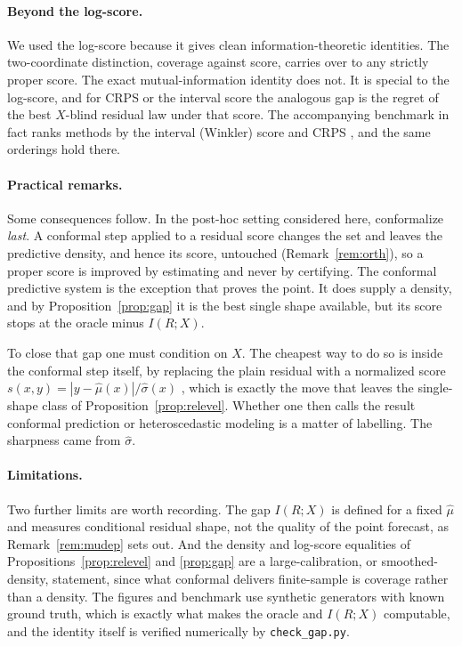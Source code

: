 \documentclass[11pt]{article}
\theoremstyle{definition}
\begin{document}
\paragraph{Beyond the log-score.}
We used the log-score because it gives clean information-theoretic identities. The
two-coordinate distinction, coverage against score, carries over to any strictly proper
score. The exact mutual-information identity does not. It is special to the log-score, and
for CRPS or the interval score the analogous gap is the regret of the best $X$-blind
residual law under that score. The accompanying benchmark in fact ranks methods by the
interval (Winkler) score and CRPS \citep{gneiting2007strictly}, and the same orderings hold
there.

\paragraph{Practical remarks.} Some consequences follow. In the post-hoc setting considered
here, conformalize \emph{last}. A conformal step applied to a residual score changes the set
and leaves the predictive density, and hence its score, untouched
(Remark~\ref{rem:orth}), so a proper score is improved by estimating and never by
certifying. The conformal predictive system is the exception that proves the point. It does
supply a density, and by Proposition~\ref{prop:gap} it is the best single shape available,
but its score stops at the oracle minus $I(R;X)$.

To close that gap one must condition on $X$. The cheapest way to do so is inside the
conformal step itself, by replacing the plain residual with a normalized score
$s(x,y)=|y-\hat\mu(x)|/\hat\sigma(x)$ \citep{lei2018distribution}, which is exactly the move
that leaves the single-shape class of Proposition~\ref{prop:relevel}. Whether one then calls
the result conformal prediction or heteroscedastic modeling is a matter of labelling. The
sharpness came from $\hat\sigma$.

\paragraph{Limitations.} Two further limits are worth recording. The gap $I(R;X)$ is defined
for a fixed $\hat\mu$ and measures conditional residual shape, not the quality of the point
forecast, as Remark~\ref{rem:mudep} sets out. And the density and log-score equalities of
Propositions~\ref{prop:relevel} and \ref{prop:gap} are a large-calibration, or
smoothed-density, statement, since what conformal delivers finite-sample is coverage rather
than a density. The figures and benchmark use synthetic generators with known ground truth,
which is exactly what makes the oracle and $I(R;X)$ computable, and the identity itself is
verified numerically by \texttt{check\_gap.py}.
\end{document}
